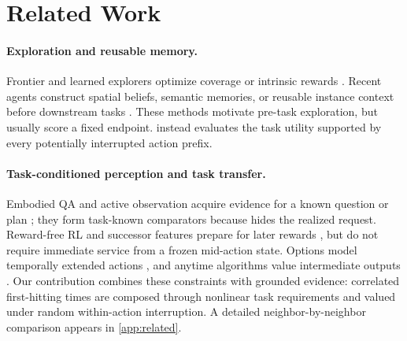 \section{Related Work}
\label{sec:related}

\paragraph{Exploration and reusable memory.}
Frontier and learned explorers optimize coverage or intrinsic rewards
\citep{yamauchi1997frontier,chaplot2020ans,sekar2020plan2explore}.
Recent agents construct spatial beliefs, semantic memories, or reusable instance context before downstream tasks
\citep{cai2026autocontext,ye2026look,zhang2026theory,chen2026abot,wang2026lmee,jiang2024roboexp}.
These methods motivate pre-task exploration, but usually score a fixed endpoint.
\taskname{} instead evaluates the task utility supported by every potentially interrupted action prefix.

\paragraph{Task-conditioned perception and task transfer.}
Embodied QA and active observation acquire evidence for a known question or plan
\citep{das2018eqa,liu2025activevoo,lee2026obsgraph}; they form task-known comparators because \taskname{} hides the realized request.
Reward-free RL and successor features prepare for later rewards
\citep{jin2020rewardfree,zhang2021rewardfree,barreto2017successor}, but do not require immediate service from a frozen mid-action state.
Options model temporally extended actions
\citep{sutton1999options}, and anytime algorithms value intermediate outputs
\citep{zilberstein1996anytime}.
Our contribution combines these constraints with grounded evidence: correlated first-hitting times are composed through nonlinear task requirements and valued under random within-action interruption.
A detailed neighbor-by-neighbor comparison appears in \cref{app:related}.

